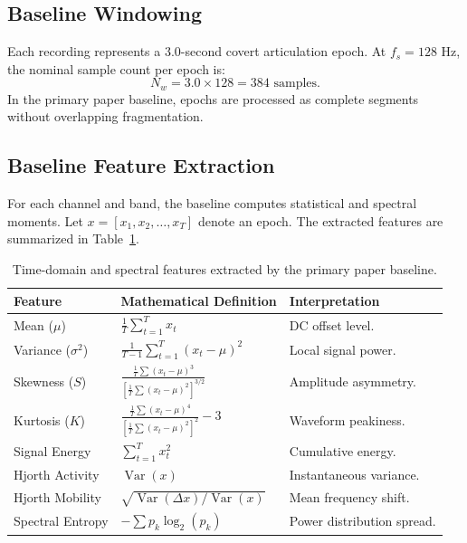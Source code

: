 \documentclass[10pt,twocolumn,a4paper]{article}
\begin{document}
\subsection{Baseline Windowing}
Each recording represents a 3.0-second covert articulation epoch. At $f_s = 128\text{ Hz}$, the nominal sample count per epoch is:
\begin{equation}
N_w = 3.0 \times 128 = 384\text{ samples}.
\label{eq:samples}
\end{equation}
In the primary paper baseline, epochs are processed as complete segments without overlapping fragmentation.

\subsection{Baseline Feature Extraction}
For each channel and band, the baseline computes statistical and spectral moments. Let $x = [x_1, x_2, \dots, x_T]$ denote an epoch. The extracted features are summarized in Table~\ref{tab:baseline_features}.

\begin{table}[H]
\centering
\caption{Time-domain and spectral features extracted by the primary paper baseline.}
\label{tab:baseline_features}
\small
\begin{tabular}{p{2.2cm} p{2.8cm} p{2.4cm}}
\toprule
\textbf{Feature} & \textbf{Mathematical Definition} & \textbf{Interpretation} \\
\midrule
Mean ($\mu$) & $\frac{1}{T}\sum_{t=1}^T x_t$ & DC offset level. \\
Variance ($\sigma^2$) & $\frac{1}{T-1}\sum_{t=1}^T (x_t - \mu)^2$ & Local signal power. \\
Skewness ($S$) & $\frac{\frac{1}{T}\sum (x_t - \mu)^3}{[\frac{1}{T}\sum (x_t - \mu)^2]^{3/2}}$ & Amplitude asymmetry. \\
Kurtosis ($K$) & $\frac{\frac{1}{T}\sum (x_t - \mu)^4}{[\frac{1}{T}\sum (x_t - \mu)^2]^2} - 3$ & Waveform peakiness. \\
Signal Energy & $\sum_{t=1}^T x_t^2$ & Cumulative energy. \\
Hjorth Activity & $\operatorname{Var}(x)$ & Instantaneous variance. \\
Hjorth Mobility & $\sqrt{\operatorname{Var}(\Delta x)/\operatorname{Var}(x)}$ & Mean frequency shift. \\
Spectral Entropy & $-\sum p_k \log_2(p_k)$ & Power distribution spread. \\
\bottomrule
\end{tabular}
\end{table}
\end{document}

